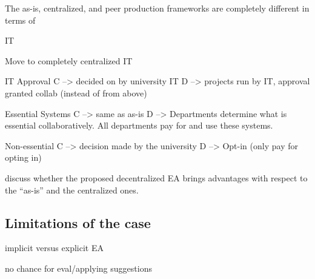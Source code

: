 



The as-is, centralized, and peer production frameworks are completely different in terms of 

IT 

Move to completely centralized IT

IT Approval
 C --> decided on by university IT
 D --> projects run by IT, approval granted collab (instead of from above)

Essential Systems 
 C --> same as as-is
 D --> Departments determine what is essential collaboratively. All departments pay for and use these systems.

Non-essential
 C --> decision made by the university
 D --> Opt-in (only pay for opting in)

discuss whether the proposed decentralized EA brings advantages with respect to the ``as-is'' and the centralized ones. 

\subsection{Limitations of the case}

implicit versus explicit EA

no chance for eval/applying suggestions




  